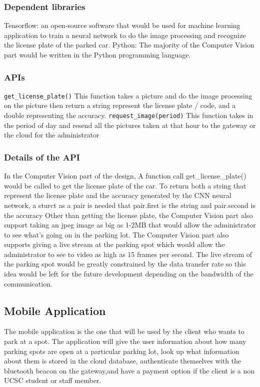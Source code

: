 \documentclass[paper=a4, fontsize=12pt]{scrartcl}
\numberwithin{equation}{section}		%
\numberwithin{figure}{section}			%
\numberwithin{table}{section}				%
\begin{document}
\subsubsection{Dependent libraries}
Tensorflow: an open-source software that would be used for machine learning application to train a neural network to do the image processing and recognize the license plate of the parked car.
Python: The majority of the Computer Vision part would be written in the Python programming language.

\subsubsection{APIs}
\verb+get_license_plate()+\newline
This function takes a picture and do the image processing on the picture then return a string represent the license plate / code, and a double representing the accuracy.\newline
\newline
\verb+request_image(period)+\newline
This function takes in the period of day and resend all the pictures taken at that hour to the gateway or the cloud for the administrator \newline
\subsubsection{Details of the API}
In the Computer Vision part of the design, A function call get\_license\_plate() would be called to get the license plate of the car. To return both a string that represent the license plate and the accuracy generated by the CNN neural network, a sturct as a pair is needed that pair.first is the string and pair.second is the accuracy
\newline
Other than getting the license plate, the Computer Vision part also support taking an jpeg image as big as 1-2MB that would allow the administrator to see what's going on in the parking lot. The Computer Vision part also supports giving a live stream at the parking spot which would allow the administrator to see to video as high as 15 frames per second. The live stream of the parking spot would be greatly constrained by the data transfer rate so this idea would be left for the future development depending on the bandwidth of the communication.


\subsection{Mobile Application}
The mobile application is the one that will be used by the client who wants to park at a spot. The application will give the user information about how many parking spots are open at a particular parking lot, look up what information about them is stored in the cloud database, authenticate themselves with the bluetooth beacon on the gateway,and have a payment option if the client is a non UCSC student or staff member.
\end{document}
